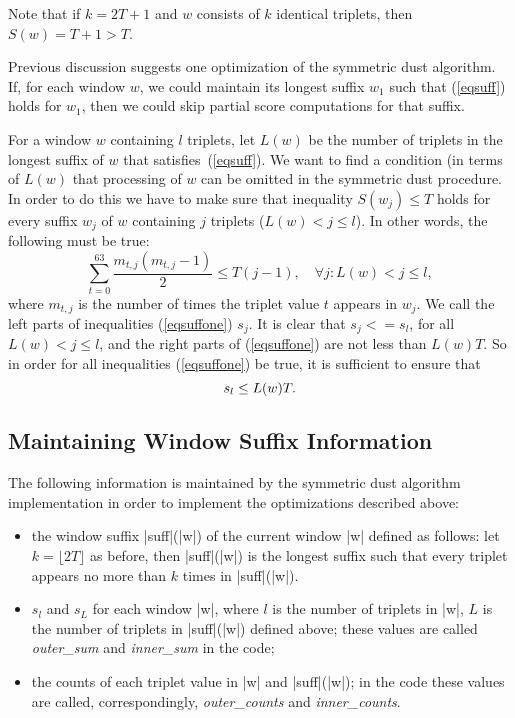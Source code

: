 \documentclass{article}
\begin{document}
Note that if $k = 2T + 1$ and $w$ consists of $k$ identical triplets, then
$S(w) = T + 1 > T$.

Previous discussion suggests one optimization of the symmetric dust algorithm.
If, for each window $w$, we could maintain its longest suffix $w_1$ such that
(\ref{eqsuff}) holds for $w_1$, then we could skip partial score computations
for that suffix.

For a window $w$ containing $l$ triplets, let $L(w)$ be the number of triplets 
in the longest suffix of $w$ that satisfies~(\ref{eqsuff}). We want to find a 
condition (in terms of $L(w)$ that processing of $w$ can be omitted in the 
symmetric dust procedure. In order to do this we have to make sure that 
inequality $S(w_j) \le T$ holds for every suffix $w_j$ of $w$ containing $j$ 
triplets ($L(w) < j \le l$). In other words, the following must be true:
\begin{equation}\label{eqsuffone}
\sum_{t=0}^{63}{\frac{m_{t,j}(m_{t,j} - 1)}{2}} \le T(j - 1),%
\quad \forall j : L(w) < j \le l,
\end{equation}
where $m_{t,j}$ is the number of times the triplet value $t$ appears in 
$w_j$. We call the left parts of inequalities (\ref{eqsuffone}) $s_j$.
It is clear that $s_j <= s_l$, for all $L(w) <j \le l$, and the right 
parts of (\ref{eqsuffone}) are not less than $L(w)T$. So in order
for all inequalities (\ref{eqsuffone}) be true, it is sufficient to ensure 
that
\begin{equation}\label{eqsufftwo}
s_l \le L(w)T {\rm .}
\end{equation}

\subsection{Maintaining Window Suffix Information}

The following information is maintained by the symmetric dust algorithm
implementation in order to implement the optimizations described above:

\begin{itemize}
\item the window suffix |suff|(|w|) of the current window |w| defined as
follows: let $k = \lfloor 2T \rfloor$ as before, then |suff|(|w|) is the
longest suffix such that every triplet appears no more than
$k$ times in |suff|(|w|).
\item $s_l$ and $s_L$ for each window |w|, where $l$ is the number of triplets 
in |w|, $L$ is the number of triplets in |suff|(|w|) defined above; these values 
are called {\em outer\_sum} and {\em inner\_sum} in the code;
\item the counts of each triplet value in |w| and |suff|(|w|); in the code these 
values are called, correspondingly, {\em outer\_counts} and {\em inner\_counts}.
\end{itemize}
\end{document}
